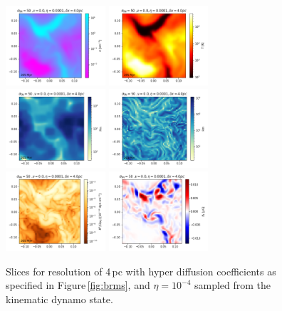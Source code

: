 \documentclass[preprint2]{aastex63}
\begin{document}
\begin{figure}
\centering
\includegraphics[trim=0.0cm 0.00cm 0.0cm 0.0cm,clip=true,width=0.33\textwidth]{csc_figs/rho4pcPm0e-4_032.png}
\includegraphics[trim=0.0cm 0.00cm 0.0cm 0.0cm,clip=true,width=0.33\textwidth]{csc_figs/tt4pcPm0e-4_032.png}
\includegraphics[trim=0.0cm 0.00cm 0.0cm 0.0cm,clip=true,width=0.33\textwidth]{csc_figs/Pm4pcPm0e-4_032.png}
\includegraphics[trim=0.0cm 0.00cm 0.0cm 0.0cm,clip=true,width=0.33\textwidth]{csc_figs/Rm4pcPm0e-4_032.png}
\includegraphics[trim=0.0cm 0.00cm 0.0cm 0.0cm,clip=true,width=0.33\textwidth]{csc_figs/pb4pcPm0e-4_032.png}
\includegraphics[trim=0.0cm 0.00cm 0.0cm 0.0cm,clip=true,width=0.33\textwidth]{csc_figs/bb14pcPm0e-4_032.png}
\caption{
Slices for resolution of 4\,pc with hyper diffusion coefficients as 
specified in Figure\,\ref{fig:brms}, and $\eta=10^{-4}$ sampled from the 
kinematic dynamo state.
\label{fig:4pcUB}
}
\end{figure}
\end{document}
